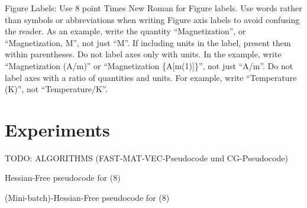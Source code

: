 \documentclass[conference]{IEEEtran}
\begin{document}
Figure Labels: Use 8 point Times New Roman for Figure labels. Use words 
rather than symbols or abbreviations when writing Figure axis labels to 
avoid confusing the reader. As an example, write the quantity 
``Magnetization'', or ``Magnetization, M'', not just ``M''. If including 
units in the label, present them within parentheses. Do not label axes only 
with units. In the example, write ``Magnetization (A/m)'' or ``Magnetization 
\{A[m(1)]\}'', not just ``A/m''. Do not label axes with a ratio of 
quantities and units. For example, write ``Temperature (K)'', not 
``Temperature/K''.

\section{Experiments}
TODO: ALGORITHMS (FAST-MAT-VEC-Pseudocode und CG-Pseudocode)

\begin{algorithm}
	\caption{Hessian-Free pseudocode for (8)}\label{alg:one}
\end{algorithm}

\begin{algorithm}
	\caption{(Mini-batch)-Hessian-Free pseudocode for (8)}\label{alg:two}
\end{algorithm}
\end{document}
